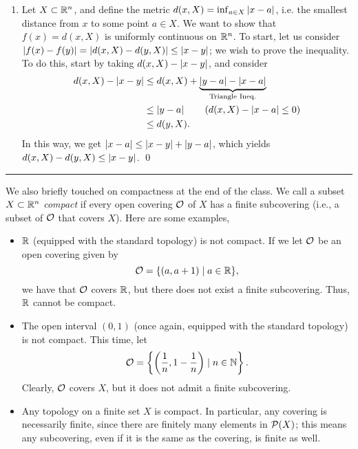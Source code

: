 \begin{enumerate}
    \item Let $X \subset \mathbb R^n$, and define the metric $d(x, X) = \inf_{a \in X} \left\lvert x - a \right\rvert$, i.e. the smallest distance from $x$ to some point $a \in X$. We want to show that $f(x) = d(x, X)$ is uniformly continuous on $\mathbb R^n$.
    \medskip\newline
    To start, let us consider $\left\lvert f(x) - f(y) \right\rvert = \left\lvert d(x, X) - d(y, X) \right\rvert \leq \left\lvert x - y \right\rvert$; we wish to prove the inequality. To do this, start by taking $d(x, X) - \left\lvert x - y \right\rvert$, and consider
    \begin{align*}
        d(x, X) - \abs{x - y} &\leq d(x, X) + \underbrace{\abs{y - a} - \abs{x - a}}_{\text{Triangle Ineq.}} \\
        &\leq \abs{y - a} \tag{$d(x, X) - \abs{x - a} \leq 0$} \\
        &\leq d(y, X).
    \end{align*}
    In this way, we get $\left\lvert x - a \right\rvert \leq \left\lvert x - y \right\rvert + \left\lvert y - a \right\rvert$, which yields $d(x, X) - d(y, X) \leq \left\lvert x - y \right\rvert$. \qed
\end{enumerate}
\bigskip\hrule\bigskip
\noindent We also briefly touched on compactness at the end of the class. We call a subset $X \subset \mathbb R^n$ \textit{compact} if every open covering $\mathcal O$ of $X$ has a finite subcovering (i.e., a subset of $\mathcal O$ that covers $X$). Here are some examples,
\begin{itemize}
    \item $\mathbb R$ (equipped with the standard topology) is not compact. If we let $\mathcal O$ be an open covering given by 
    \[ \mathcal O = \{ (a, a+1) \mid a \in \mathbb R \}, \]
    we have that $\mathcal O$ covers $\mathbb R$, but there does not exist a finite subcovering. Thus, $\mathbb R$ cannot be compact.
    \item The open interval $(0, 1)$ (once again, equipped with the standard topology) is not compact. This time, let
    \[ \mathcal O = \left\{ \left( \frac{1}{n}, 1 - \frac{1}{n} \right) \mid n \in \mathbb N \right\}. \]
    Clearly, $\mathcal O$ covers $X$, but it does not admit a finite subcovering.
    \item Any topology on a finite set $X$ is compact. In particular, any covering is necessarily finite, since there are finitely many elements in $\mathcal P(X)$; this means any subcovering, even if it is the same as the covering, is finite as well.
\end{itemize}